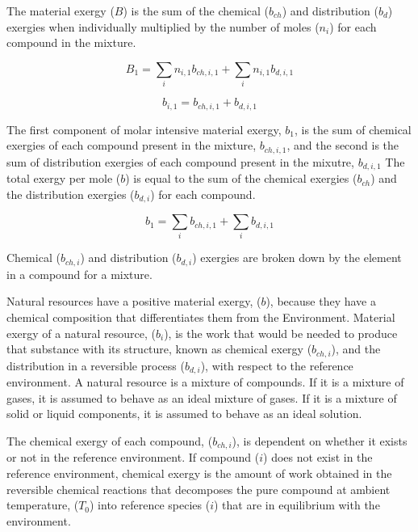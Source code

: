 \documentclass[energies,article,submit,pdftex,moreauthors]{Definitions/mdpi}
\begin{document}
The material exergy ($B$) is the sum of the chemical ($b_{ch}$) and distribution ($b_d$) exergies
when individually multiplied
by the number of moles ($n_i$)
for each compound in the mixture.

\begin{equation}\label{eq:specific_exergy_definition}
  B_{1} = \sum_{i}{n_{i,1}b_{ch,i,1}} + \sum_{i}{n_{i,1}b_{d,i,1}}
\end{equation}

\begin{equation}\label{eq:simplified_material_exergy_definition}
  b_{i,1} = b_{ch,i,1} + b_{d,i,1}
\end{equation}


The first component of molar intensive material exergy, $b_{1}$,
is the sum of chemical exergies of each compound
present in the mixture, $b_{ch,i,1}$,
and the second is the sum of distribution exergies of each compound
present in the mixutre, $b_{d,i,1}$
The total exergy per mole ($b$) is equal to the sum of the chemical exergies ($b_{ch}$)
and the distribution exergies ($b_{d,i}$) for each compound.

\begin{equation}\label{eq:specific_molar_intensive_exergy_definition}
  b_{1} = \sum_{i}{b_{ch,i,1}} + \sum_{i}{b_{d,i,1}}
\end{equation}

Chemical ($b_{ch,i}$) and distribution ($b_{d,i}$) exergies are broken down
by the element in a compound
for a mixture.

Natural resources have a positive material exergy, ($b$),
because they have a chemical composition
that differentiates them from the Environment.
Material exergy of a natural resource, ($b_{i}$),
is the work that would be needed
to produce that substance with its structure,
known as chemical exergy ($b_{ch,i}$),
and the distribution in a reversible process ($b_{d,i}$),
with respect to the reference environment.
A natural resource is a mixture of compounds.
If it is a mixture of gases,
it is assumed to behave as an ideal mixture of gases.
If it is a mixture of solid or liquid components,
it is assumed to behave as an ideal solution.

The chemical exergy of each compound, ($b_{ch,i}$), is dependent
on whether it exists or not
in the reference environment.
If compound ($i$) does not exist
in the reference environment,
chemical exergy is the amount of work obtained
in the reversible chemical reactions
that decomposes the pure compound at ambient temperature, ($T_{0}$)
into reference species ($i$) that are in equilibrium
with the environment.
\end{document}
